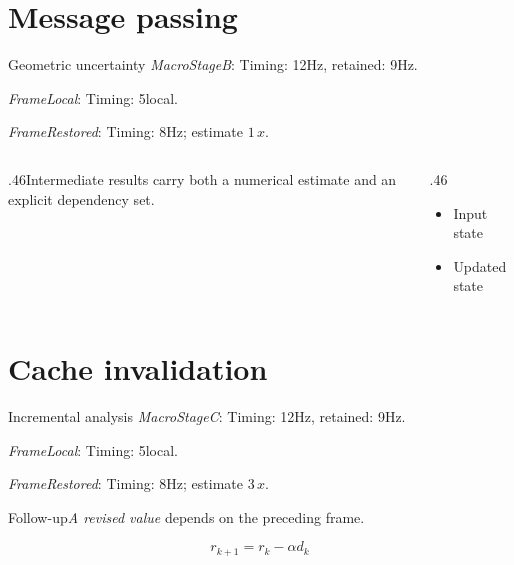 \documentclass[9pt,aspectratio=43]{beamer}
\newcommand{\fuzzlayerA}[1]{\textit{#1}}
\newcommand{\fuzzterm}[1]{\fuzzlayerA{#1}}
\newcommand{\fuzzpair}[2]{\fuzzterm{#1}: #2}
\newcommand{\fuzzunit}{Hz}
\let\fuzzoriginalunit\fuzzunit
\newcommand{\fuzzcoefficient}{1}
\newcommand{\fuzzscale}[2][\fuzzcoefficient]{#1\,#2}
\begin{document}
\section{Message passing}
\begin{frame}[t]{Geometric uncertainty}
\fuzzpair{MacroStageB}{Timing: 12\fuzzunit, retained: 9\fuzzoriginalunit.}\par
{\renewcommand{\fuzzunit}{local}\fuzzpair{FrameLocal}{Timing: 5\fuzzunit.}\par}
\fuzzpair{FrameRestored}{Timing: 8\fuzzunit; estimate $\fuzzscale{x}$.}\par
\begin{columns}[T]\begin{column}{.46\textwidth}Intermediate results carry both a numerical estimate and an explicit dependency set.\end{column}\begin{column}{.46\textwidth}\begin{itemize}\item Input state\item Updated state\end{itemize}\end{column}\end{columns}
\end{frame}
\renewcommand{\fuzzunit}{Hz}
\renewcommand{\fuzzcoefficient}{3}
\renewcommand{\fuzzterm}[1]{{\textit{#1}}}
\section{Cache invalidation}
\begin{frame}[t]{Incremental analysis}
\fuzzpair{MacroStageC}{Timing: 12\fuzzunit, retained: 9\fuzzoriginalunit.}\par
{\renewcommand{\fuzzunit}{local}\fuzzpair{FrameLocal}{Timing: 5\fuzzunit.}\par}
\fuzzpair{FrameRestored}{Timing: 8\fuzzunit; estimate $\fuzzscale{x}$.}\par
\begin{block}{Follow-up}\fuzzterm{A revised value} depends on the preceding frame.\end{block}
\[r_{k+1}=r_k-\alpha d_k\]
\end{frame}
\end{document}
